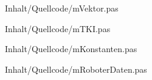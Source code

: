 
				 {Inhalt/Quellcode/mVektor.pas}


				 {Inhalt/Quellcode/mTKI.pas}
\newpage				 

				 {Inhalt/Quellcode/mKonstanten.pas}
				 

				 {Inhalt/Quellcode/mRoboterDaten.pas}